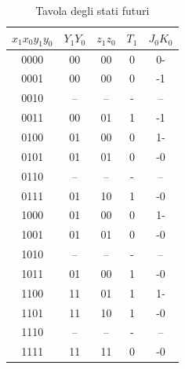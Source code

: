 \begin{exercise}
\begin{enumerate}
    \begin{table}[ht]
        \centering
        \begin{tabular}{|c|c|c|c|c|}
        \hline $x_1x_0y_1y_0$ & $Y_1Y_0$ & $z_1z_0$ & $T_1$ & $J_0K_0$\\\hline\hline
            0000 & 00 & 00 & 0 & 0-\\
            0001 & 00 & 00 & 0 & -1\\
            0010 & -- & -- & - & --\\
            0011 & 00 & 01 & 1 & -1\\\hline
            0100 & 01 & 00 & 0 & 1-\\
            0101 & 01 & 01 & 0 & -0\\
            0110 & -- & -- & - & --\\
            0111 & 01 & 10 & 1 & -0\\\hline
            1000 & 01 & 00 & 0 & 1-\\
            1001 & 01 & 01 & 0 & -0\\
            1010 & -- & -- & - & --\\
            1011 & 01 & 00 & 1 & -0\\\hline
            1100 & 11 & 01 & 1 & 1-\\
            1101 & 11 & 10 & 1 & -0\\
            1110 & -- & -- & - & --\\
            1111 & 11 & 11 & 0 & -0\\\hline
        \end{tabular}
        \caption{Tavola degli stati futuri}
    \end{table}
    

\end{enumerate}
\end{exercise}
